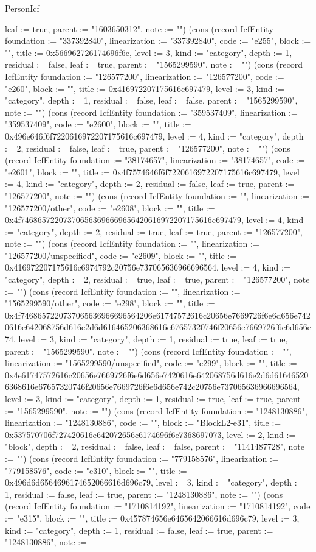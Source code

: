 \begin{lexlean}{PersonIcf}
\begin{semanticmodule}
{leaf := true, parent := "1603650312", note := ""}) (cons (record IcfEntity {foundation := "337392840", linearization := "337392840", code := "e255", block := "", title := 0x566962726174696f6e, level := 3, kind := "category", depth := 1, residual := false, leaf := true, parent := "1565299590", note := ""}) (cons (record IcfEntity {foundation := "126577200", linearization := "126577200", code := "e260", block := "", title := 0x416972207175616c697479, level := 3, kind := "category", depth := 1, residual := false, leaf := false, parent := "1565299590", note := ""}) (cons (record IcfEntity {foundation := "359537409", linearization := "359537409", code := "e2600", block := "", title := 0x496e646f6f7220616972207175616c697479, level := 4, kind := "category", depth := 2, residual := false, leaf := true, parent := "126577200", note := ""}) (cons (record IcfEntity {foundation := "38174657", linearization := "38174657", code := "e2601", block := "", title := 0x4f7574646f6f7220616972207175616c697479, level := 4, kind := "category", depth := 2, residual := false, leaf := true, parent := "126577200", note := ""}) (cons (record IcfEntity {foundation := "", linearization := "126577200/other", code := "e2608", block := "", title := 0x4f746865722073706563696669656420616972207175616c697479, level := 4, kind := "category", depth := 2, residual := true, leaf := true, parent := "126577200", note := ""}) (cons (record IcfEntity {foundation := "", linearization := "126577200/unspecified", code := "e2609", block := "", title := 0x416972207175616c6974792c20756e737065636966696564, level := 4, kind := "category", depth := 2, residual := true, leaf := true, parent := "126577200", note := ""}) (cons (record IcfEntity {foundation := "", linearization := "1565299590/other", code := "e298", block := "", title := 0x4f7468657220737065636966696564206e61747572616c20656e7669726f6e6d656e7420616e642068756d616e2d6d616465206368616e67657320746f20656e7669726f6e6d656e74, level := 3, kind := "category", depth := 1, residual := true, leaf := true, parent := "1565299590", note := ""}) (cons (record IcfEntity {foundation := "", linearization := "1565299590/unspecified", code := "e299", block := "", title := 0x4e61747572616c20656e7669726f6e6d656e7420616e642068756d616e2d6d616465206368616e67657320746f20656e7669726f6e6d656e742c20756e737065636966696564, level := 3, kind := "category", depth := 1, residual := true, leaf := true, parent := "1565299590", note := ""}) (cons (record IcfEntity {foundation := "1248130886", linearization := "1248130886", code := "", block := "BlockL2-e31", title := 0x537570706f727420616e642072656c6174696f6e7368697073, level := 2, kind := "block", depth := 2, residual := false, leaf := false, parent := "1141487728", note := ""}) (cons (record IcfEntity {foundation := "779158576", linearization := "779158576", code := "e310", block := "", title := 0x496d6d6564696174652066616d696c79, level := 3, kind := "category", depth := 1, residual := false, leaf := true, parent := "1248130886", note := ""}) (cons (record IcfEntity {foundation := "1710814192", linearization := "1710814192", code := "e315", block := "", title := 0x457874656e6465642066616d696c79, level := 3, kind := "category", depth := 1, residual := false, leaf := true, parent := "1248130886", note := }
\end{semanticmodule}
\end{lexlean}
